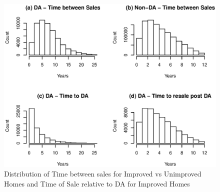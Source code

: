 \documentclass[AEJ,reqno, draftmode]{AEA} %
\begin{document}

\captionsetup[figure]{font=large,skip=0pt}

\begin{figure}[!tp]
    \centering
     \includegraphics[width=0.95\columnwidth]{Figures/Rplot_time_bet_sales_notional2004.eps} \par
 \caption{Distribution of Time between sales for Improved vs Unimproved Homes and Time of Sale relative to DA for Improved Homes}
 \label{fig:Rplot_month_bet_sale_notional}


\end{figure}
\end{document}
